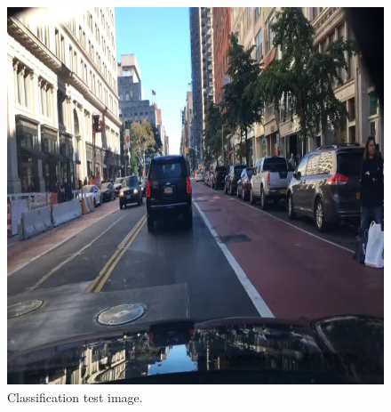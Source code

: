 \begin{figure}
\centering
\includegraphics[width=\subfigwidth]{images/gpt4/d1.jpg}
\caption[Test image]{Classification test image.}
\label{fig:test_image}
\end{figure}

